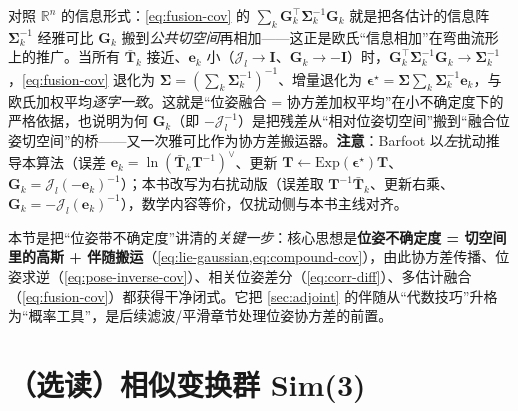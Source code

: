 \begin{insight}[融合 = 李群上的“信息相加”]
对照 $\mathbb{R}^n$ 的信息形式：\cref{eq:fusion-cov} 的 $\sum_k\mathbf{G}_k^\top\boldsymbol{\Sigma}_k^{-1}\mathbf{G}_k$ 就是把各估计的信息阵 $\boldsymbol{\Sigma}_k^{-1}$ 经雅可比 $\mathbf{G}_k$ 搬到\emph{公共切空间}再相加——这正是欧氏“信息相加”在弯曲流形上的推广。当所有 $\bar{\mathbf{T}}_k$ 接近、$\mathbf{e}_k$ 小（$\boldsymbol{\mathcal{J}}_l\to\mathbf{I}$、$\mathbf{G}_k\to-\mathbf{I}$）时，$\mathbf{G}_k^\top\boldsymbol{\Sigma}_k^{-1}\mathbf{G}_k\to\boldsymbol{\Sigma}_k^{-1}$，\cref{eq:fusion-cov} 退化为 $\boldsymbol{\Sigma}=(\sum_k\boldsymbol{\Sigma}_k^{-1})^{-1}$、增量退化为 $\boldsymbol{\epsilon}^\star=\boldsymbol{\Sigma}\sum_k\boldsymbol{\Sigma}_k^{-1}\mathbf{e}_k$，与欧氏加权平均\emph{逐字一致}。这就是“位姿融合 = 协方差加权平均”在小不确定度下的严格依据，也说明为何 $\mathbf{G}_k$（即 $-\boldsymbol{\mathcal{J}}_l^{-1}$）是把残差从“相对位姿切空间”搬到“融合位姿切空间”的桥——又一次雅可比作为协方差搬运器。\textbf{注意}：Barfoot 以\emph{左}扰动推导本算法（误差 $\mathbf{e}_k=\ln(\bar{\mathbf{T}}_k\mathbf{T}^{-1})^\vee$、更新 $\mathbf{T}\leftarrow\mathrm{Exp}(\boldsymbol{\epsilon}^\star)\mathbf{T}$、$\mathbf{G}_k=\boldsymbol{\mathcal{J}}_l(-\mathbf{e}_k)^{-1}$）\cite{barfoot2024state}；本书改写为右扰动版（误差取 $\mathbf{T}^{-1}\bar{\mathbf{T}}_k$、更新右乘、$\mathbf{G}_k=-\boldsymbol{\mathcal{J}}_l(\mathbf{e}_k)^{-1}$），数学内容等价，仅扰动侧与本书主线对齐。
\end{insight}

\begin{insight}
本节是把“位姿带不确定度”讲清的\emph{关键一步}：核心思想是\textbf{位姿不确定度 = 切空间里的高斯 + 伴随搬运}（\cref{eq:lie-gaussian,eq:compound-cov}），由此协方差传播、位姿求逆（\cref{eq:pose-inverse-cov}）、相关位姿差分（\cref{eq:corr-diff}）、多估计融合（\cref{eq:fusion-cov}）都获得干净闭式\cite{barfoot2024state}。它把 \cref{sec:adjoint} 的伴随从“代数技巧”升格为“概率工具”，是后续滤波/平滑章节处理位姿协方差的前置。
\end{insight}

\section{（选读）相似变换群 Sim(3)}
\label{sec:sim3}

